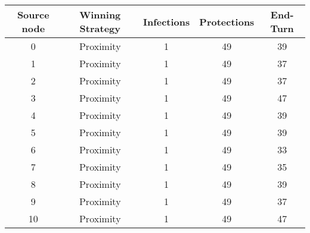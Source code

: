 \documentclass[results.tex]{subfiles}
\begin{document}
    \begin{center}
        \begin{tabular}{| c || c | c | c | c |}
            \hline
            {\bfseries Source node} & {\bfseries Winning Strategy} & {\bfseries Infections} & {\bfseries Protections}
            & {\bfseries End-Turn}
            \\  %
            \hline\hline
            0                       & Proximity                    & 1                      & 49                      & 39                   \\
            \hline
            1                       & Proximity                    & 1                      & 49                      & 37                   \\
            \hline
            2                       & Proximity                    & 1                      & 49                      & 37                   \\
            \hline
            3                       & Proximity                    & 1                      & 49                      & 47                   \\
            \hline
            4                       & Proximity                    & 1                      & 49                      & 39                   \\
            \hline
            5                       & Proximity                    & 1                      & 49                      & 39                   \\
            \hline
            6                       & Proximity                    & 1                      & 49                      & 33                   \\
            \hline
            7                       & Proximity                    & 1                      & 49                      & 35                   \\
            \hline
            8                       & Proximity                    & 1                      & 49                      & 39                   \\
            \hline
            9                       & Proximity                    & 1                      & 49                      & 37                   \\
            \hline
            10                      & Proximity                    & 1                      & 49                      & 47                   \\

\end{tabular}
\end{center}
\end{document}
